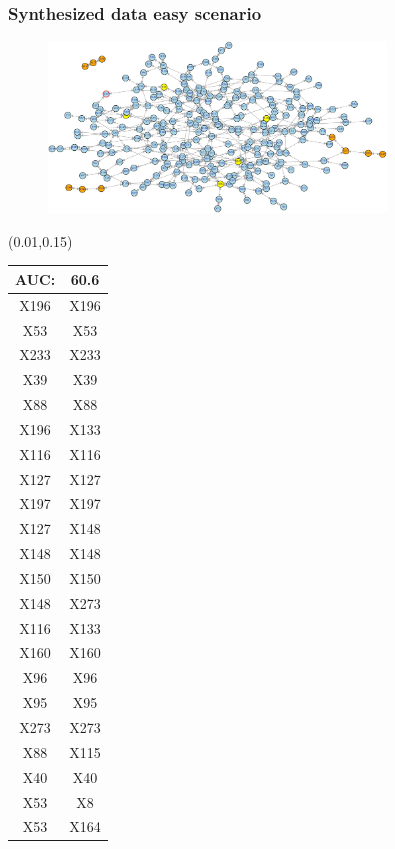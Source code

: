 \documentclass{beamer}
\newcommand{\boz}{\cellcolor{pathwaynode}}
\newcommand{\ghool}{\cellcolor{independentnode}}
\begin{document}
\begin{frame}[plain]
  \frametitle{Synthesized data easy scenario}
  \begin{figure}
    \includegraphics[width=0.8\textwidth]{synthesized-easy}
  \end{figure}
  \begin{textblock*}{\paperwidth}(0.01\textwidth,0.15\textheight)
    \raggedright 
    \tiny
    \begin{tabular}{| c c |}
      \hline
AUC: & 60.6 \\ \hline \hline
\boz X196   &  \boz X196  \\ \hline
X53   &  X53  \\ \hline
X233   &  X233  \\ \hline
X39   &  X39  \\ \hline
\ghool X88   &  \ghool X88  \\ \hline
\boz X196   &  \boz X133  \\ \hline
\boz X116   &  \boz X116  \\ \hline
X127   &  X127  \\ \hline
X197   &  X197  \\ \hline
X127   &  X148  \\ \hline
X148   &  X148  \\ \hline
\boz X150   &  \boz X150  \\ \hline
X148   &  X273  \\ \hline
\boz X116   &  \boz X133  \\ \hline
X160   &  X160  \\ \hline
\ghool X96   &  \ghool X96  \\ \hline
X95   &  X95  \\ \hline
X273   &  X273  \\ \hline
\ghool X88   &  X115  \\ \hline
X40   &  X40  \\ \hline
X53   &  X8  \\ \hline
X53   &  X164  \\ \hline

\end{tabular}
\end{textblock*}
\end{frame}
\end{document}
